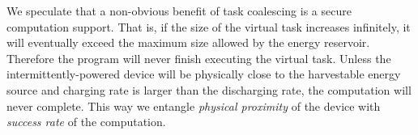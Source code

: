We speculate that a non-obvious benefit of task coalescing is a secure computation support. That is, if the size of the virtual task increases infinitely, it will eventually exceed the maximum size allowed by the energy reservoir. Therefore the program will never finish executing the virtual task. Unless the intermittently-powered device will be physically close to the harvestable energy source and charging rate is larger than the discharging rate, the computation will never complete. This way we entangle \emph{physical proximity} of the device with \emph{success rate} of the computation.